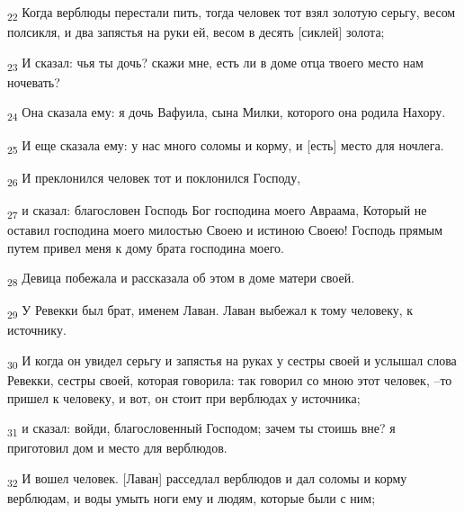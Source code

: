 \begin{tcolorbox}
\textsubscript{22} Когда верблюды перестали пить, тогда человек тот взял золотую серьгу, весом полсикля, и два запястья на руки ей, весом в десять [сиклей] золота;
\end{tcolorbox}
\begin{tcolorbox}
\textsubscript{23} И сказал: чья ты дочь? скажи мне, есть ли в доме отца твоего место нам ночевать?
\end{tcolorbox}
\begin{tcolorbox}
\textsubscript{24} Она сказала ему: я дочь Вафуила, сына Милки, которого она родила Нахору.
\end{tcolorbox}
\begin{tcolorbox}
\textsubscript{25} И еще сказала ему: у нас много соломы и корму, и [есть] место для ночлега.
\end{tcolorbox}
\begin{tcolorbox}
\textsubscript{26} И преклонился человек тот и поклонился Господу,
\end{tcolorbox}
\begin{tcolorbox}
\textsubscript{27} и сказал: благословен Господь Бог господина моего Авраама, Который не оставил господина моего милостью Своею и истиною Своею! Господь прямым путем привел меня к дому брата господина моего.
\end{tcolorbox}
\begin{tcolorbox}
\textsubscript{28} Девица побежала и рассказала об этом в доме матери своей.
\end{tcolorbox}
\begin{tcolorbox}
\textsubscript{29} У Ревекки был брат, именем Лаван. Лаван выбежал к тому человеку, к источнику.
\end{tcolorbox}
\begin{tcolorbox}
\textsubscript{30} И когда он увидел серьгу и запястья на руках у сестры своей и услышал слова Ревекки, сестры своей, которая говорила: так говорил со мною этот человек, --то пришел к человеку, и вот, он стоит при верблюдах у источника;
\end{tcolorbox}
\begin{tcolorbox}
\textsubscript{31} и сказал: войди, благословенный Господом; зачем ты стоишь вне? я приготовил дом и место для верблюдов.
\end{tcolorbox}
\begin{tcolorbox}
\textsubscript{32} И вошел человек. [Лаван] расседлал верблюдов и дал соломы и корму верблюдам, и воды умыть ноги ему и людям, которые были с ним;
\end{tcolorbox}
